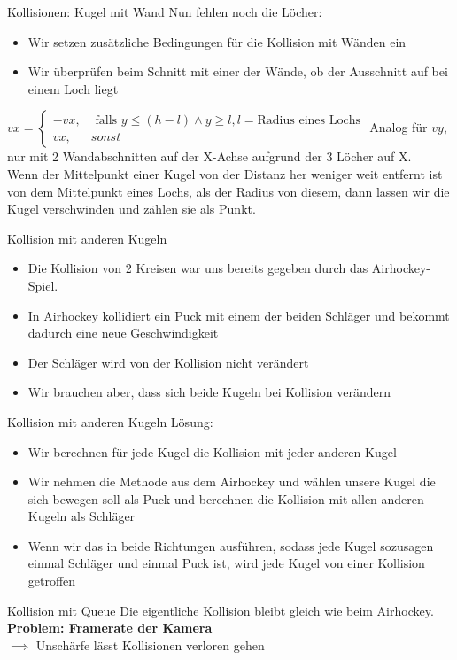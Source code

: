 \begin{frame}{Kollisionen: Kugel mit Wand}
Nun fehlen noch die Löcher: 
\begin{itemize}
	\item Wir setzen zusätzliche Bedingungen für die Kollision mit Wänden ein
	\item Wir überprüfen beim Schnitt mit einer der Wände, ob der Ausschnitt auf bei einem Loch liegt 	
\end{itemize}

$vx = \begin{cases}
-vx, & \text{ falls } y \leq (h- l) \land y \geq l, l = \text{Radius eines Lochs}\\
vx, & sonst 
\end{cases}$
Analog für $vy$, nur mit 2 Wandabschnitten auf der X-Achse aufgrund der 3 Löcher auf X. \\
Wenn der Mittelpunkt einer Kugel von der Distanz her weniger weit entfernt ist von dem Mittelpunkt eines Lochs, als der Radius von diesem, dann lassen wir die Kugel verschwinden und zählen sie als Punkt.

\end{frame}

\begin{frame}{Kollision mit anderen Kugeln}
\begin{itemize}
	\item Die Kollision von 2 Kreisen war uns bereits gegeben durch das Airhockey-Spiel.
	\item In Airhockey kollidiert ein Puck mit einem der beiden Schläger und bekommt dadurch eine neue Geschwindigkeit
	\item Der Schläger wird von der Kollision nicht verändert
	\item Wir brauchen aber, dass sich beide Kugeln bei Kollision verändern
\end{itemize}
\end{frame}
\begin{frame}{Kollision mit anderen Kugeln}
Lösung:
\begin{itemize}
	\item Wir berechnen für jede Kugel die Kollision mit jeder anderen Kugel
	\item Wir nehmen die Methode aus dem Airhockey und wählen unsere Kugel die sich bewegen soll als Puck und berechnen die Kollision mit allen anderen Kugeln als Schläger
	\item Wenn wir das in beide Richtungen ausführen, sodass jede Kugel sozusagen einmal Schläger und einmal Puck ist, wird jede Kugel von einer Kollision getroffen 
\end{itemize}
\end{frame}
\begin{frame}{Kollision mit Queue}
Die eigentliche Kollision bleibt gleich wie beim Airhockey. \\
\textbf{Problem: Framerate der Kamera} \\
$\implies$ Unschärfe lässt Kollisionen verloren gehen
\end{frame}